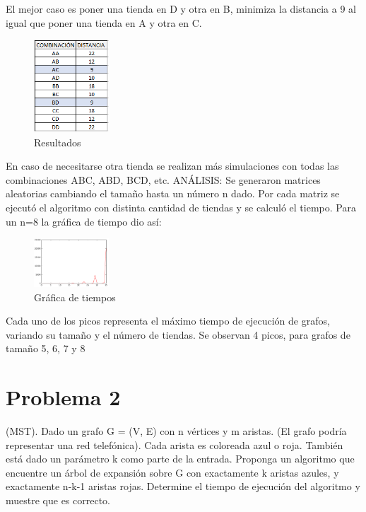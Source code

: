 \documentclass[conference,compsoc]{IEEEtran}
\begin{document}
$$$$$$$$$$$$
El mejor caso es poner una tienda en D y otra en B, minimiza la distancia a 9 al igual que poner una tienda en A y otra en C.
$$$$
\begin{figure}[h]
    \centering
    \includegraphics[width=0.25\textwidth]{Problema1/p117.png}
    \caption{Resultados}
    \label{fig:mesh1}
\end{figure}

En caso de necesitarse otra tienda se realizan más simulaciones con todas las combinaciones ABC, ABD, BCD, etc. 
ANÁLISIS:
Se generaron matrices aleatorias cambiando el tamaño hasta un número n dado. Por cada matriz se ejecutó el algoritmo con distinta cantidad de tiendas y se calculó el tiempo. Para un n=8 la gráfica de tiempo dio así:

\begin{figure}[h]
    \centering
    \includegraphics[width=0.25\textwidth]{Problema1/p118.png}
    \caption{Gráfica de tiempos}
    \label{fig:mesh1}
\end{figure}

Cada uno de los picos representa el máximo tiempo de ejecución de grafos, variando su tamaño y el número de tiendas.
Se observan 4 picos, para grafos de tamaño 5, 6, 7 y 8


\section{Problema 2}
(MST). Dado un grafo G = (V, E) con n vértices y m aristas. (El grafo podría representar una red telefónica). Cada arista es coloreada azul o roja. También está dado un parámetro k como parte de la entrada. Proponga un algoritmo que encuentre un árbol de expansión sobre G con exactamente k aristas azules, y exactamente n-k-1 aristas rojas. Determine el tiempo de ejecución del algoritmo y muestre que es correcto.
\end{document}
